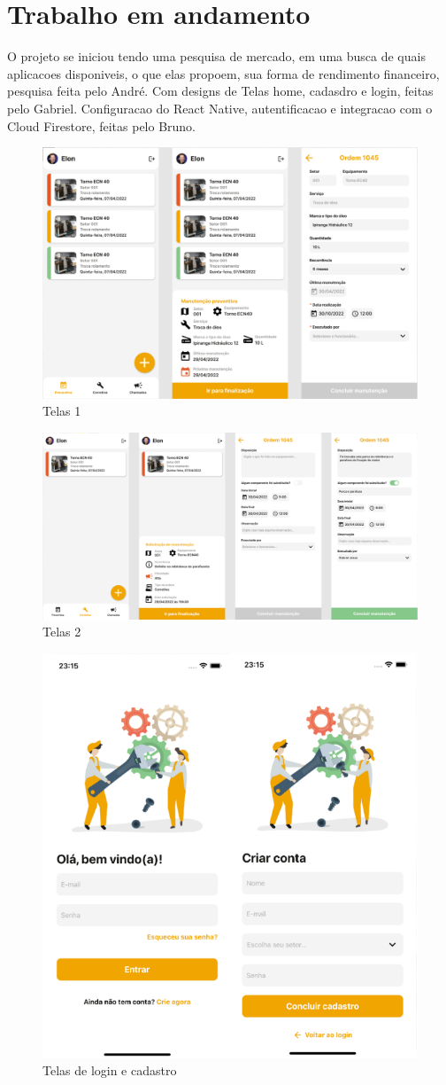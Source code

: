 \documentclass[%
  a4paper,%
  12pt,%
  english,%
  brazilian,%
]{article}
\begin{document}
\section{Trabalho em andamento}%
O projeto se iniciou tendo uma pesquisa de mercado, em uma busca de quais aplicacoes disponiveis, o que elas propoem, sua forma de rendimento financeiro, pesquisa feita pelo André. Com designs de Telas home, cadasdro e login, feitas pelo Gabriel. Configuracao do React Native, autentificacao e integracao com o Cloud Firestore, feitas pelo Bruno.
\begin{figure}[!htb]
\includegraphics[width = 0.6\linewidth]{Figures/t1.PNG}
\caption{Telas 1}
\end{figure}

\begin{figure}[!htb]
\includegraphics[width = 0.6\linewidth]{Figures/t2.PNG}
\caption{Telas 2}
\end{figure}

\begin{figure}[!htb]
\includegraphics[width = 0.35\linewidth]{Figures/t3.PNG}
\caption{Telas de login e cadastro}
\end{figure}
\end{document}
